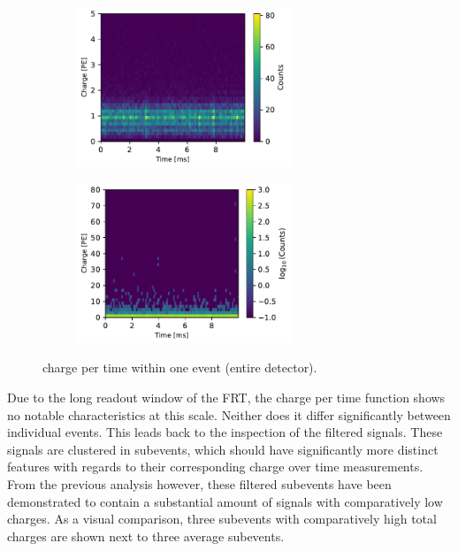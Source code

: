 \begin{figure}[ht]
    \centering
    \begin{subfigure}[b]{\textwidth}
        \centering
        \includegraphics[width=0.7\textwidth]{Plots/charge_time_1_lin.pdf}
    \end{subfigure}
    \vspace{1em} %
    \begin{subfigure}[b]{\textwidth}
        \centering
        \includegraphics[width=0.7\textwidth]{Plots/charge_time_1_log.pdf}
    \end{subfigure}
    \caption{charge per time within one event (entire detector).}
    \label{fig:charge_time_1}
\end{figure}

Due to the long readout window of the FRT, the charge per time function shows no notable characteristics at this scale. Neither does it differ significantly between 
individual events. This leads back to the inspection of the filtered signals. These signals are clustered in subevents, which should have significantly
more distinct features with regards to their corresponding charge over time measurements. From the previous analysis however, these filtered subevents 
have been demonstrated to contain a substantial amount of signals with comparatively low charges. As a visual comparison, three subevents with comparatively high 
total charges are shown next to three average subevents. 


